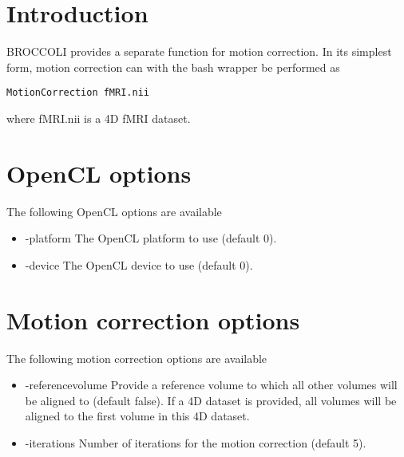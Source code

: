 \section{Introduction}

BROCCOLI provides a separate function for motion correction. In its simplest form, motion correction can with the bash wrapper be performed as

\begin{verbatim}
MotionCorrection fMRI.nii
\end{verbatim}
where fMRI.nii is a 4D fMRI dataset.

\section{OpenCL options}

The following OpenCL options are available

\begin{itemize}

\item -platform
\newline \newline The OpenCL platform to use (default 0).

\item -device
\newline \newline The OpenCL device to use (default 0).

\end{itemize}

\section{Motion correction options}

The following motion correction options are available

\begin{itemize}

\item -referencevolume
\newline \newline Provide a reference volume to which all other volumes will be aligned to (default false). If a 4D dataset is provided, all volumes will be aligned to the first volume in this 4D dataset.

\item -iterations  
\newline \newline Number of iterations for the motion correction (default 5). 

\end{itemize}

